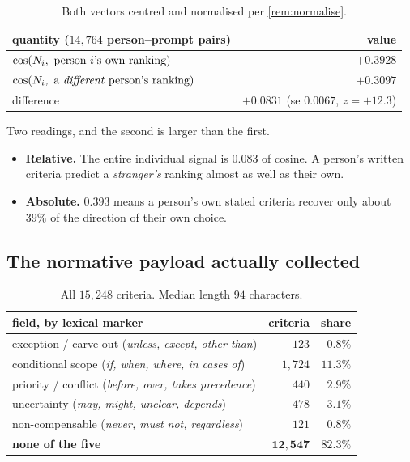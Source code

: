 \begin{table}[H]\centering\small
\begin{tabular}{lr}
\toprule
quantity ($14{,}764$ person--prompt pairs) & value \\
\midrule
$\cos(\Nn_i,\ \text{person } i\text{'s own ranking})$ & $+0.3928$\\
$\cos(\Nn_i,\ \text{a \emph{different} person's ranking})$ & $+0.3097$\\
difference & $+0.0831$ (se $0.0067$, $z=+12.3$)\\
\bottomrule
\end{tabular}
\caption{Both vectors centred and normalised per \cref{rem:normalise}.}
\label{tab:selfother}
\end{table}

Two readings, and the second is larger than the first.

\begin{itemize}
\item \textbf{Relative.} The entire individual signal is $0.083$ of cosine. A
      person's written criteria predict a \emph{stranger's} ranking almost as
      well as their own.
\item \textbf{Absolute.} $0.393$ means a person's own stated criteria recover
      only about $39\%$ of the direction of their own choice.
\end{itemize}


\subsection{The normative payload actually collected}

\begin{table}[H]\centering\small
\begin{tabular}{lrr}
\toprule
field, by lexical marker & criteria & share \\
\midrule
exception / carve-out (\emph{unless, except, other than}) & $123$ & $0.8\%$\\
conditional scope (\emph{if, when, where, in cases of}) & $1{,}724$ & $11.3\%$\\
priority / conflict (\emph{before, over, takes precedence}) & $440$ & $2.9\%$\\
uncertainty (\emph{may, might, unclear, depends}) & $478$ & $3.1\%$\\
non-compensable (\emph{never, must not, regardless}) & $121$ & $0.8\%$\\
\midrule
\textbf{none of the five} & $\mathbf{12{,}547}$ & $\mathbf{82.3\%}$\\
\bottomrule
\end{tabular}
\caption{All $15{,}248$ criteria. Median length $94$ characters.}
\label{tab:payload}
\end{table}

